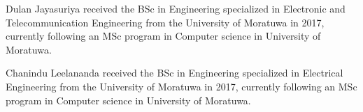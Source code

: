 \begin{IEEEbiography}{Dulan Jayasuriya}
received the BSc in Engineering specialized in Electronic and Telecommunication Engineering from the University of Moratuwa in 2017, currently following an MSc program in Computer science in University of Moratuwa.
\end{IEEEbiography}
\begin{IEEEbiography}{Chanindu Leelananda}
received the BSc in Engineering specialized in Electrical Engineering from the University of Moratuwa in 2017, currently following an MSc program in Computer science in University of Moratuwa.
\end{IEEEbiography}





